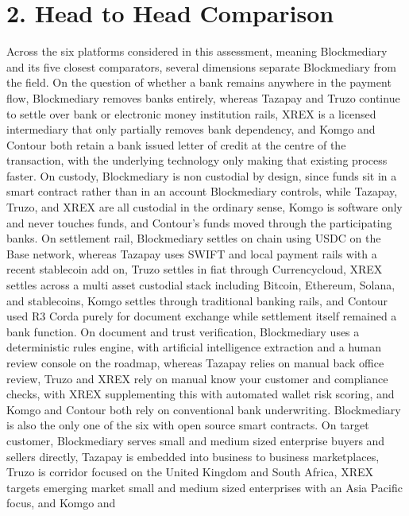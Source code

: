 \documentclass[12pt, a4paper]{article}
\begin{document}
\section*{2. Head to Head Comparison}

Across the six platforms considered in this assessment, meaning Blockmediary and its five
closest comparators, several dimensions separate Blockmediary from the field. On the
question of whether a bank remains anywhere in the payment flow, Blockmediary removes
banks entirely, whereas Tazapay and Truzo continue to settle over bank or electronic money
institution rails, XREX is a licensed intermediary that only partially removes bank
dependency, and Komgo and Contour both retain a bank issued letter of credit at the centre
of the transaction, with the underlying technology only making that existing process
faster. On custody, Blockmediary is non custodial by design, since funds sit in a smart
contract rather than in an account Blockmediary controls, while Tazapay, Truzo, and XREX
are all custodial in the ordinary sense, Komgo is software only and never touches funds,
and Contour's funds moved through the participating banks. On settlement rail,
Blockmediary settles on chain using USDC on the Base network, whereas Tazapay uses SWIFT
and local payment rails with a recent stablecoin add on, Truzo settles in fiat through
Currencycloud, XREX settles across a multi asset custodial stack including Bitcoin,
Ethereum, Solana, and stablecoins, Komgo settles through traditional banking rails, and
Contour used R3 Corda purely for document exchange while settlement itself remained a bank
function. On document and trust verification, Blockmediary uses a deterministic rules
engine, with artificial intelligence extraction and a human review console on the roadmap,
whereas Tazapay relies on manual back office review, Truzo and
XREX rely on manual know your customer and compliance checks, with XREX supplementing this
with automated wallet risk scoring, and Komgo and Contour both rely on conventional bank
underwriting. Blockmediary is also the only one of the six with open source smart
contracts. On target customer, Blockmediary serves small and medium sized enterprise
buyers and sellers directly, Tazapay is embedded into business to business marketplaces,
Truzo is corridor focused on the United Kingdom and South Africa, XREX targets emerging
market small and medium sized enterprises with an Asia Pacific focus, and Komgo and
\end{document}
